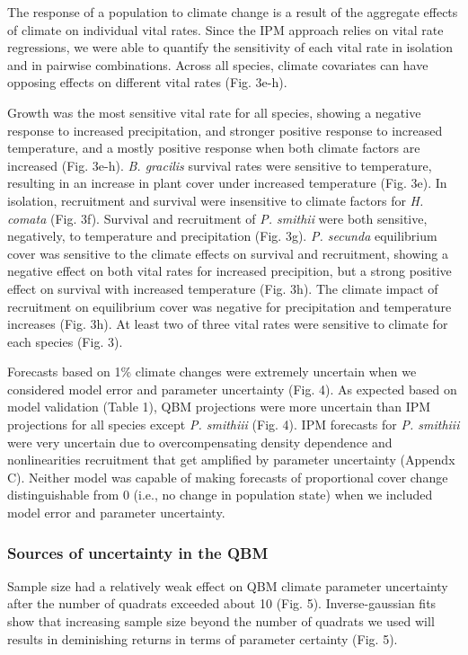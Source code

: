\documentclass[12pt,]{article}
\begin{document}
The response of a population to climate change is a result of the
aggregate effects of climate on individual vital rates. Since the IPM
approach relies on vital rate regressions, we were able to quantify the
sensitivity of each vital rate in isolation and in pairwise
combinations. Across all species, climate covariates can have opposing
effects on different vital rates (Fig. 3e-h).

Growth was the most sensitive vital rate for all species, showing a
negative response to increased precipitation, and stronger positive
response to increased temperature, and a mostly positive response when
both climate factors are increased (Fig. 3e-h). \emph{B. gracilis}
survival rates were sensitive to temperature, resulting in an increase
in plant cover under increased temperature (Fig. 3e). In isolation,
recruitment and survival were insensitive to climate factors for
\emph{H. comata} (Fig. 3f). Survival and recruitment of \emph{P.
smithii} were both sensitive, negatively, to temperature and
precipitation (Fig. 3g). \emph{P. secunda} equilibrium cover was
sensitive to the climate effects on survival and recruitment, showing a
negative effect on both vital rates for increased precipition, but a
strong positive effect on survival with increased temperature (Fig. 3h).
The climate impact of recruitment on equilibrium cover was negative for
precipitation and temperature increases (Fig. 3h). At least two of three
vital rates were sensitive to climate for each species (Fig. 3).

Forecasts based on 1\% climate changes were extremely uncertain when we
considered model error and parameter uncertainty (Fig. 4). As expected
based on model validation (Table 1), QBM projections were more uncertain
than IPM projections for all species except \emph{P. smithiii} (Fig. 4).
IPM forecasts for \emph{P. smithiii} were very uncertain due to
overcompensating density dependence and nonlinearities recruitment that
get amplified by parameter uncertainty (Appendx C). Neither model was
capable of making forecasts of proportional cover change distinguishable
from 0 (i.e., no change in population state) when we included model
error and parameter uncertainty.

\subsubsection{Sources of uncertainty in the
QBM}\label{sources-of-uncertainty-in-the-qbm}

Sample size had a relatively weak effect on QBM climate parameter
uncertainty after the number of quadrats exceeded about 10 (Fig. 5).
Inverse-gaussian fits show that increasing sample size beyond the number
of quadrats we used will results in deminishing returns in terms of
parameter certainty (Fig. 5).
\end{document}
